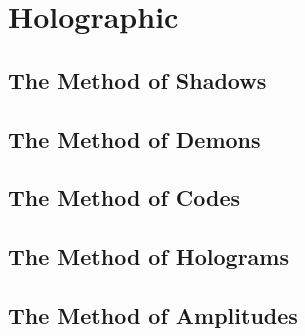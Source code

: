 \documentclass{antiquebook}
\begin{document}
\chapter{Holographic}

    \section{The Method of Shadows}
    
    \section{The Method of Demons}
    
    \section{The Method of Codes}
    
    \section{The Method of Holograms}
    
    \section{The Method of Amplitudes}
\end{document}
